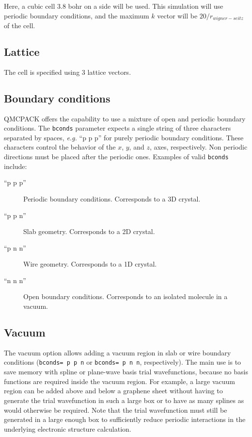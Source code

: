 Here, a cubic cell 3.8 bohr on a side will be used.
This simulation will use periodic boundary conditions, and the maximum
$k$ vector will be $20/r_{wigner-seitz}$ of the cell.


\subsection{Lattice}
The cell is specified using 3 lattice vectors.


\subsection{Boundary conditions}
QMCPACK offers the capability to use a mixture of open and periodic boundary conditions.
The \texttt{bconds} parameter expects a single string of three characters separated by
spaces, \textit{e.g.} ``p p p'' for purely periodic boundary conditions. These characters control
the behavior of the $x$, $y$, and $z$, axes, respectively. Non periodic directions must be placed after the periodic ones.
Examples of valid \texttt{bconds} include:

\begin{description}
\item[``p p p''] Periodic boundary conditions. Corresponds to a 3D crystal.
\item[``p p n''] Slab geometry. Corresponds to a 2D crystal.
\item[``p n n''] Wire geometry. Corresponds to a 1D crystal.
\item[``n n n''] Open boundary conditions. Corresponds to an isolated molecule in a vacuum.
\end{description}

\subsection{Vacuum}
The vacuum option allows adding a vacuum region in slab or wire boundary conditions
(\texttt{bconds= p p n} or \texttt{bconds= p n n}, respectively). The main use is
to save memory with spline or plane-wave basis trial wavefunctions, because no basis
functions are required inside the vacuum region. For example, a large vacuum region
can be added above and below a graphene sheet without having to generate the trial
wavefunction in such a large box or to have as many splines as would otherwise
be required. Note that the trial wavefunction must still be generated in a
large enough box to sufficiently reduce periodic interactions in the underlying
electronic structure calculation.

